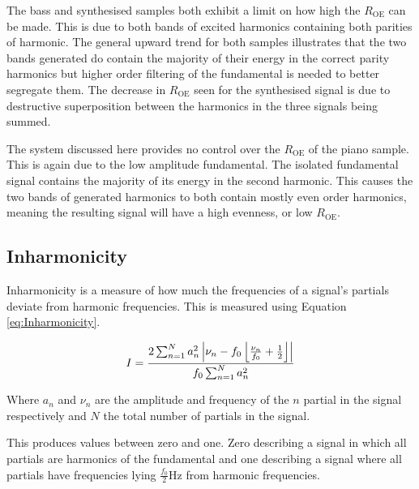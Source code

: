 			The bass and synthesised samples both exhibit a limit on how high the $R_{\textrm{OE}}$ can be
			made. This is due to both bands of excited harmonics containing both parities of harmonic.  The
			general upward trend for both samples illustrates that the two bands generated do contain the
			majority of their energy in the correct parity harmonics but higher order filtering of the
			fundamental is needed to better segregate them. The decrease in $R_{\textrm{OE}}$ seen for the
			synthesised signal is due to destructive superposition between the harmonics in the three signals
			being summed.

			The system discussed here provides no control over the $R_{\textrm{OE}}$ of the piano sample. This
			is again due to the low amplitude fundamental. The isolated fundamental signal contains the
			majority of its energy in the second harmonic. This causes the two bands of generated harmonics to
			both contain mostly even order harmonics, meaning the resulting signal will have a high evenness,
			or low $R_{\textrm{OE}}$.

	\subsection{Inharmonicity}
	\label{sec:FeatureControl-Parameterisation-Inharmonicity}
		Inharmonicity is a measure of how much the frequencies of a signal's partials deviate from harmonic
		frequencies. This is measured using Equation \ref{eq:Inharmonicity}.
		
		\begin{equation}
			I = \frac{2\sum_{n = 1}^{N}a_{n}^{2}
			           \left|\nu_{n} - f_{0}\left\lfloor\frac{\nu_{n}}{f_{0}} + \frac{1}{2}\right\rfloor\right|}
				   {f_{0}\sum_{n = 1}^{N} a_{n}^{2}}
			\label{eq:Inharmonicity}
		\end{equation}

		Where $a_{n}$ and $\nu_{n}$ are the amplitude and frequency of the $n$ partial in the signal
		respectively and $N$ the total number of partials in the signal.

		This produces values between zero and one. Zero describing a signal in which all partials are harmonics of
		the fundamental and one describing a signal where all partials have frequencies lying
		$\frac{f_{0}}{2}$Hz from harmonic frequencies.

